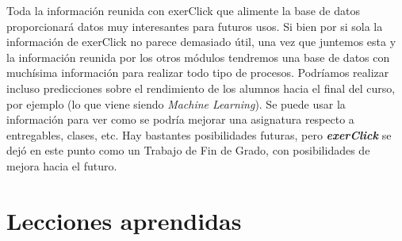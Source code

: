 Toda la información reunida con exerClick que alimente la base de datos proporcionará datos muy interesantes para futuros usos. Si bien por si sola la información de exerClick no parece demasiado útil, una vez que juntemos esta y la información reunida por los otros módulos tendremos una base de datos con muchísima información para realizar todo tipo de procesos. Podríamos realizar incluso predicciones sobre el rendimiento de los alumnos hacia el final del curso, por ejemplo (lo que viene siendo \textit{Machine Learning}). Se puede usar la información para ver como se podría mejorar una asignatura respecto a entregables, clases, etc. Hay bastantes posibilidades futuras, pero \textit{\textbf{exerClick}} se dejó en este punto como un Trabajo de Fin de Grado, con posibilidades de mejora hacia el futuro.\\

\section{Lecciones aprendidas}

